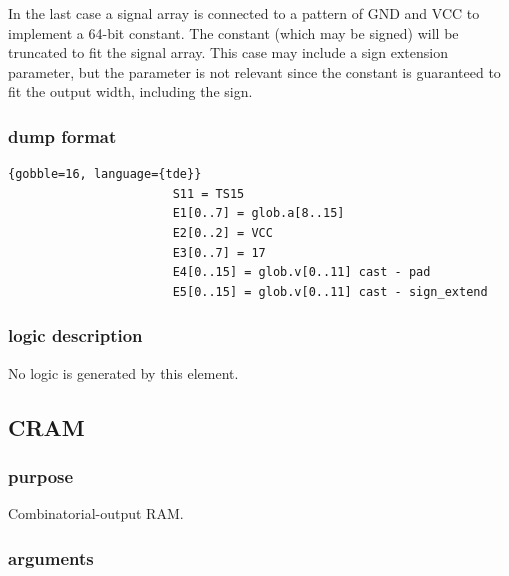 \documentclass[10pt,a4paper,twoside,fleqn]{book}
\begin{document}
                In the last case a signal array is connected to a pattern of GND
                and VCC to implement a 64-bit constant. The constant (which may
                be signed) will be truncated to fit the signal array. This case
                may include a sign extension parameter, but the parameter is not
                relevant since the constant is guaranteed to fit the output
                width, including the sign.

            \subsubsection{dump format}
            
                \begin{lstlisting}{gobble=16, language={tde}}
                       S11 = TS15
                       E1[0..7] = glob.a[8..15]
                       E2[0..2] = VCC
                       E3[0..7] = 17
                       E4[0..15] = glob.v[0..11] cast - pad
                       E5[0..15] = glob.v[0..11] cast - sign_extend
                \end{lstlisting}


            \subsubsection{logic description}

                No logic is generated by this element.


            \subsection{CRAM}

                \subsubsection{purpose}

                    Combinatorial-output RAM.

                \subsubsection{arguments}
\end{document}
